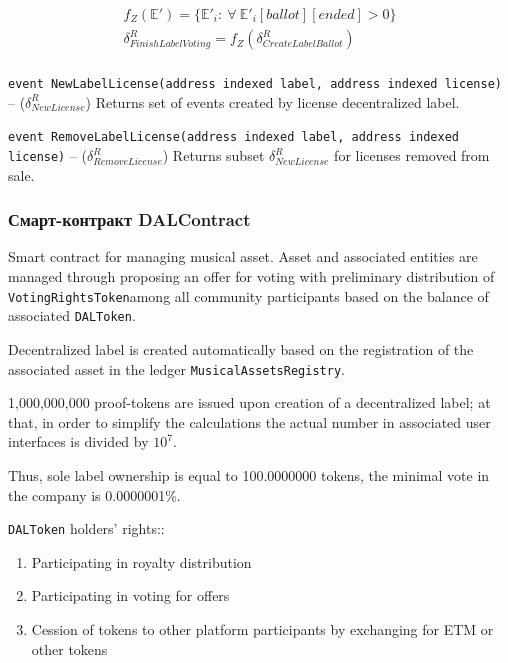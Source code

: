 \documentclass[12pt]{report}
\def\code#1{\colorbox{light-gray}{\texttt{#1}}}
\begin{document}
\begin{equation}
\begin{aligned}
f_Z(\mathbb{E}') = \{\mathbb{E}'_i : \ \forall \ \mathbb{E}'_i[ballot][ended] > 0 \} \\
\delta^R_{FinishLabelVoting} = f_Z(\delta^R_{CreateLabelBallot}) \\
\end{aligned}
\end{equation}

\code{event NewLabelLicense(address indexed label, address indexed license)} – ($\delta^R_{NewLicense}$)\hfill\null\linebreak
Returns set of events created by license decentralized label.

\code{event RemoveLabelLicense(address indexed label, address indexed license)} – ($\delta^R_{RemoveLicense}$)\hfill\null\linebreak
Returns subset $\delta^R_{NewLicense}$ for licenses removed from sale.

\subsubsection{Смарт-контракт DALContract}
\label{tech-apps-dal-label}
Smart contract for managing musical asset. Asset and associated entities are managed through proposing an offer for voting with preliminary distribution of \code{VotingRightsToken}among all community participants based on the balance of associated \code{DALToken}.
 
Decentralized label is created automatically based on the registration of the associated asset in the ledger \code{MusicalAssetsRegistry}.

1,000,000,000 proof-tokens are issued upon creation of a decentralized label; at that, in order to simplify the calculations the actual number in associated user interfaces is divided by $10^7$. 

Thus, sole label ownership is equal to 100.0000000 tokens, the minimal vote in the company is 0.0000001\%.

\code{DALToken} holders' rights::
\begin{enumerate}
	\item Participating in royalty distribution
	\item Participating in voting for offers
	\item Cession of tokens to other platform participants by exchanging for ETM or other tokens
\end{enumerate}
\end{document}
